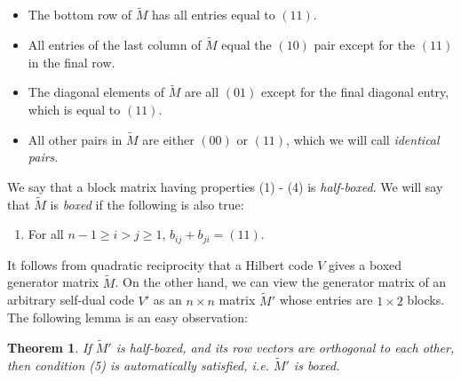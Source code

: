 \documentclass[noams]{compositio}
\newtheorem{lem}{Theorem}[section]
\theoremstyle{definition} %
\theoremstyle{remark} %
\begin{document}
\begin{flushleft}
\begin{itemize}
\item[(1)] The bottom row of $\tilde M$ has all entries equal to $(11)$.
\item[(2)] All entries
of the last column of $\tilde{M}$ equal the $(10)$ pair except for the $(11)$ in the final row.
\item[(3)] The diagonal elements of $\tilde{M}$ are all $(01)$ except for the final diagonal entry, which is equal to  $(11)$.
\item[(4)] All other pairs in $\tilde{M}$ are either $(00)$ or $(11)$, which we will call \emph{identical pairs}.
\end{itemize}
\end{flushleft}

We say that a block matrix having properties (1) - (4) is \emph{half-boxed}.  We will say that
$\tilde{M}$ is \emph{boxed} if the following is also true:
\begin{enumerate}
\item[(5)] For all $n-1 \ge i>j \ge 1$, $b_{ij} + b_{ji} = (11)$.
\end{enumerate}

It follows from quadratic reciprocity that a Hilbert code $V$ gives a boxed generator matrix $\tilde M$.
On the other hand, we can view the generator matrix of an arbitrary self-dual code $V'$ as an $n \times n$
matrix $\tilde M'$ whose entries are $1 \times 2$ blocks. The following lemma is an easy observation:

\begin{lem}\label{lem:box}
If $\tilde M'$ is half-boxed, and its row vectors are orthogonal to each other, then condition (5) is automatically satisfied, i.e. $\tilde M'$
is boxed.
\end{lem}
 
\end{document}
